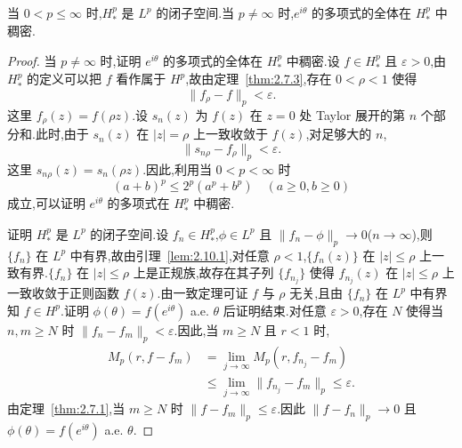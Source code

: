 \begin{theorem}\label{thm:2.10.2}
当 $0 < p \leq \infty$ 时,$H_{*}^{p}$ 是 $L^{p}$ 的闭子空间.当 $p \neq \infty$ 时,$e^{i\theta}$ 的多项式的全体在 $H_{*}^{p}$ 中稠密.
\end{theorem}

\begin{proof}
当 $p \neq \infty$ 时,证明 $e^{i\theta}$ 的多项式的全体在 $H_{*}^{p}$ 中稠密.设 $f \in H_{*}^{p}$ 且 $\varepsilon > 0$,由 $H_{*}^{p}$ 的定义可以把 $f$ 看作属于 $H^{p}$,故由定理~\ref{thm:2.7.3},存在 $0 < \rho < 1$ 使得
\begin{equation*}
\|f_{\rho} - f\|_{p} < \varepsilon.
\end{equation*}
这里 $f_{\rho}(z) = f(\rho z)$.设 $s_{n}(z)$ 为 $f(z)$ 在 $z = 0$ 处 Taylor 展开的第 $n$ 个部分和.此时,由于 $s_{n}(z)$ 在 $|z| = \rho$ 上一致收敛于 $f(z)$,对足够大的 $n$,
\begin{equation*}
\|s_{n\rho} - f_{\rho}\|_{p} < \varepsilon.
\end{equation*}
这里 $s_{n\rho}(z) = s_{n}(\rho z)$.因此,利用当 $0 < p < \infty$ 时
\begin{equation*}
(a + b)^{p} \leq 2^{p}(a^{p} + b^{p}) \quad (a \geq 0, b \geq 0)
\end{equation*}
成立,可以证明 $e^{i\theta}$ 的多项式在 $H_{*}^{p}$ 中稠密.

证明 $H_{*}^{p}$ 是 $L^{p}$ 的闭子空间.设 $f_{n} \in H_{*}^{p}$,$\phi \in L^{p}$ 且 $\|f_{n} - \phi\|_{p} \to 0$($n \to \infty$),则 $\{f_{n}\}$ 在 $L^{p}$ 中有界,故由引理~\ref{lem:2.10.1},对任意 $\rho < 1$,$\{f_{n}(z)\}$ 在 $|z| \leq \rho$ 上一致有界.$\{f_{n}\}$ 在 $|z| \leq \rho$ 上是正规族,故存在其子列 $\{f_{n_{j}}\}$ 使得 $f_{n_{j}}(z)$ 在 $|z| \leq \rho$ 上一致收敛于正则函数 $f(z)$.由一致定理可证 $f$ 与 $\rho$ 无关,且由 $\{f_{n}\}$ 在 $L^{p}$ 中有界知 $f \in H^{p}$.证明 $\phi(\theta) = f(e^{i\theta})$ a.e. $\theta$ 后证明结束.对任意 $\varepsilon > 0$,存在 $N$ 使得当 $n, m \geq N$ 时 $\|f_{n} - f_{m}\|_{p} < \varepsilon$.因此,当 $m \geq N$ 且 $r < 1$ 时,
\begin{align*}
M_{p}(r, f - f_{m}) & = \lim_{j \to \infty}M_{p}(r, f_{n_{j}} - f_{m}) \\
& \leq \lim_{j \to \infty}\|f_{n_{j}} - f_{m}\|_{p} \leq \varepsilon.
\end{align*}
由定理~\ref{thm:2.7.1},当 $m \geq N$ 时 $\|f - f_{m}\|_{p} \leq \varepsilon$.因此 $\|f - f_{n}\|_{p} \to 0$ 且 $\phi(\theta) = f(e^{i\theta})$ a.e. $\theta$.
\end{proof}

